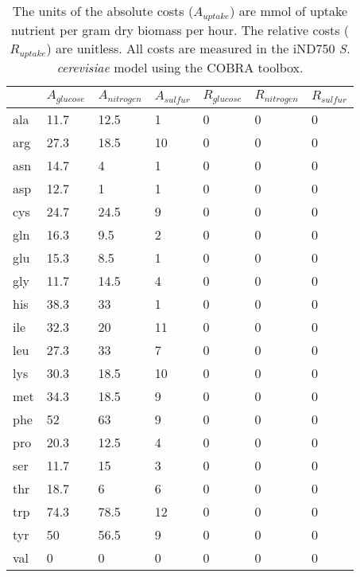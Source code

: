 \begin{table}
\begin{footnotesize}
  \begin{tabular}{ p{1cm} *{6}{p{1.9cm}} }
  \toprule
      & $A_{glucose}$ & $A_{nitrogen}$ & $A_{sulfur}$ & $R_{glucose} $ & $R_{nitrogen}$ & $R_{sulfur}$ \\ \midrule
      ala & 11.7 & 12.5 & 1  & 0 & 0 & 0 \\
      arg & 27.3 & 18.5 & 10 & 0 & 0 & 0 \\
      asn & 14.7 & 4    & 1  & 0 & 0 & 0 \\
      asp & 12.7 & 1    & 1  & 0 & 0 & 0 \\
      cys & 24.7 & 24.5 & 9  & 0 & 0 & 0 \\
      gln & 16.3 & 9.5  & 2  & 0 & 0 & 0 \\
      glu & 15.3 & 8.5  & 1  & 0 & 0 & 0 \\
      gly & 11.7 & 14.5 & 4  & 0 & 0 & 0 \\
      his & 38.3 & 33   & 1  & 0 & 0 & 0 \\
      ile & 32.3 & 20   & 11 & 0 & 0 & 0 \\
      leu & 27.3 & 33   & 7  & 0 & 0 & 0 \\
      lys & 30.3 & 18.5 & 10 & 0 & 0 & 0 \\
      met & 34.3 & 18.5 & 9  & 0 & 0 & 0 \\
      phe & 52   & 63   & 9  & 0 & 0 & 0 \\
      pro & 20.3 & 12.5 & 4  & 0 & 0 & 0 \\
      ser & 11.7 & 15   & 3  & 0 & 0 & 0 \\
      thr & 18.7 & 6    & 6  & 0 & 0 & 0 \\
      trp & 74.3 & 78.5 & 12 & 0 & 0 & 0 \\
      tyr & 50   & 56.5 & 9  & 0 & 0 & 0 \\
      val & 0    & 0    & 0  & 0 & 0 & 0 \\ \bottomrule
  \end{tabular}
\end{footnotesize}
\caption[\emph{S. cerevisiae} estimated absolute and relative amino acid costs]{The units of the absolute costs ($A_{uptake}$) are mmol of uptake nutrient per gram dry biomass per hour. The relative costs ($R_{uptake}$) are unitless. All costs are measured in the iND750 \emph{S. cerevisiae} model using the COBRA toolbox.} 
\label{appendix:table:estimated_costs}
\end{table}

